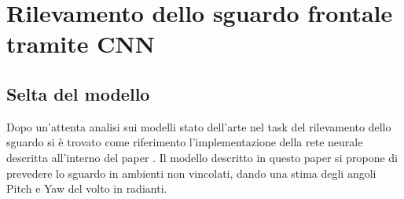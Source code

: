 \documentclass[12pt,a4paper,openright,twoside]{book}
\begin{document}
\chapter{Rilevamento dello sguardo frontale tramite CNN}
\section{Selta del modello}
Dopo un'attenta analisi sui modelli stato dell'arte nel task del rilevamento dello sguardo si è trovato come riferimento l'implementazione della rete neurale descritta all'interno del paper \cite[L2CS-NET: FINE-GRAINED GAZE ESTIMATION IN UNCONSTRAINED ENVIRONMENTS]{10372944}.
Il modello descritto in questo paper si propone di prevedere lo sguardo in ambienti non vincolati, dando una stima degli angoli Pitch e Yaw del volto in radianti.
\end{document}
